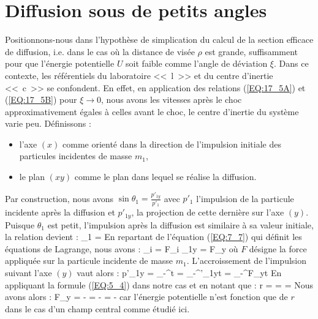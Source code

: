 \section{Diffusion sous de petits angles}

Positionnons-nous dans l'hypoth\`ese de simplication du calcul de la section efficace de diffusion, i.e. dans le cas o\`u la distance de vis\'ee $\rho$ est grande, suffisamment pour que l'\'energie potentielle $U$ soit faible comme l'angle de d\'eviation $\xi$. Dans ce contexte, les r\'ef\'erentiels du laboratoire <<~l~>> et du centre d'inertie <<~c~>> se confondent. En effet, en application des relations (\ref{EQ:17_5A}) et (\ref{EQ:17_5B}) pour $\xi \rightarrow 0$, nous avons les vitesses apr\`es le choc approximativement \'egales \`a celles avant le choc, le centre d'inertie du syst\`eme varie peu.
D\'efinissons :
\begin{itemize}
	\item l'axe $(x)$ comme orient\'e dans la direction de l'impulsion initiale des particules incidentes de masse $m_{1}$,
	\item le plan $(xy)$ comme le plan dans lequel se r\'ealise la diffusion.
\end{itemize}
Par construction, nous avons $\sin\theta_{1} = \frac{p'_{1y}}{p'_{1}}$ avec $p'_{1}$ l'impulsion de la particule incidente apr\`es la diffusion et $p'_{1y}$, la projection de cette derni\`ere sur l'axe $(y)$. Puisque $\theta_{1}$ est petit, l'impulsion apr\`es la diffusion est similaire \`a sa valeur initiale, la relation devient :
\be
	\theta_{1} =  \label{EQ:20_1}
\ee
En repartant de l'\'equation (\ref{EQ:7_7}) qui d\'efinit les \'equations de Lagrange, nous avons :
\benn
	_{i} = F_{i} \Leftrightarrow {}_{1y} = F_{y}
\eenn
o\`u $F$ d\'esigne la force appliqu\'ee sur la particule incidente de masse $m_{1}$. L'accroissement de l'impulsion suivant l'axe $(y)$ vaut alors :
\be
	p'_{1y} = \int_{-\infty}^{\infty}t = \int_{-\infty}^{\infty}'_{1y}t = \int_{-\infty}^{\infty}F_{y}t \label{EQ:20_2}
\ee
En appliquant la formule (\ref{EQ:5_4}) dans notre cas et en notant que :
\benn
	r =  \Rightarrow {} =  = 
\eenn
Nous avons alors :
\benn
	F_{y} = - = - = -
\eenn
car l'\'energie potentielle n'est fonction que de $r$ dans le cas d'un champ central comme \'etudi\'e ici.

